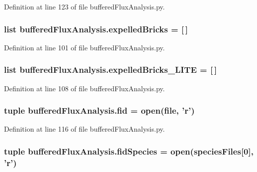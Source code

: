 Definition at line 123 of file buffered\-Flux\-Analysis.\-py.

\hypertarget{namespacebuffered_flux_analysis_abb64e6cc33529d672b220bca854fcc5c}{
\subsubsection[{expelled\-Bricks}]{\setlength{\rightskip}{0pt plus 5cm}list buffered\-Flux\-Analysis.\-expelled\-Bricks = \mbox{[}$\,$\mbox{]}}}\label{namespacebuffered_flux_analysis_abb64e6cc33529d672b220bca854fcc5c}


Definition at line 101 of file buffered\-Flux\-Analysis.\-py.

\hypertarget{namespacebuffered_flux_analysis_a6add3eeb2b7903c31bd378684f0ae0f7}{
\subsubsection[{expelled\-Bricks\-\_\-\-L\-I\-T\-E}]{\setlength{\rightskip}{0pt plus 5cm}list buffered\-Flux\-Analysis.\-expelled\-Bricks\-\_\-\-L\-I\-T\-E = \mbox{[}$\,$\mbox{]}}}\label{namespacebuffered_flux_analysis_a6add3eeb2b7903c31bd378684f0ae0f7}


Definition at line 108 of file buffered\-Flux\-Analysis.\-py.

\hypertarget{namespacebuffered_flux_analysis_a490a31896b3a0812a6e9ed57cd4be1c9}{
\subsubsection[{fid}]{\setlength{\rightskip}{0pt plus 5cm}tuple buffered\-Flux\-Analysis.\-fid = open({\bf file}, '{\bf r}')}}\label{namespacebuffered_flux_analysis_a490a31896b3a0812a6e9ed57cd4be1c9}


Definition at line 116 of file buffered\-Flux\-Analysis.\-py.

\hypertarget{namespacebuffered_flux_analysis_a56ea4478f0de4eca040d22421819e250}{
\subsubsection[{fid\-Species}]{\setlength{\rightskip}{0pt plus 5cm}tuple buffered\-Flux\-Analysis.\-fid\-Species = open({\bf species\-Files}\mbox{[}0\mbox{]}, '{\bf r}')}}\label{namespacebuffered_flux_analysis_a56ea4478f0de4eca040d22421819e250}


